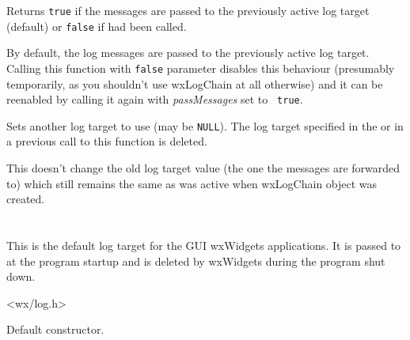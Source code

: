 
Returns {\tt true} if the messages are passed to the previously active log
target (default) or {\tt false} if 
had been called.

\label{wxlogchainpassmessages}


By default, the log messages are passed to the previously active log target.
Calling this function with {\tt false} parameter disables this behaviour
(presumably temporarily, as you shouldn't use wxLogChain at all otherwise) and
it can be reenabled by calling it again with {\it passMessages} set to {\tt
true}.

\label{wxlogchainsetlog}


Sets another log target to use (may be {\tt NULL}). The log target specified
in the  or in a previous call to
this function is deleted.

This doesn't change the old log target value (the one the messages are
forwarded to) which still remains the same as was active when wxLogChain
object was created.


\section{}\label{wxloggui}

This is the default log target for the GUI wxWidgets applications. It is passed
to  at the program
startup and is deleted by wxWidgets during the program shut down.




<wx/log.h>


\label{wxlogguictor}


Default constructor.

